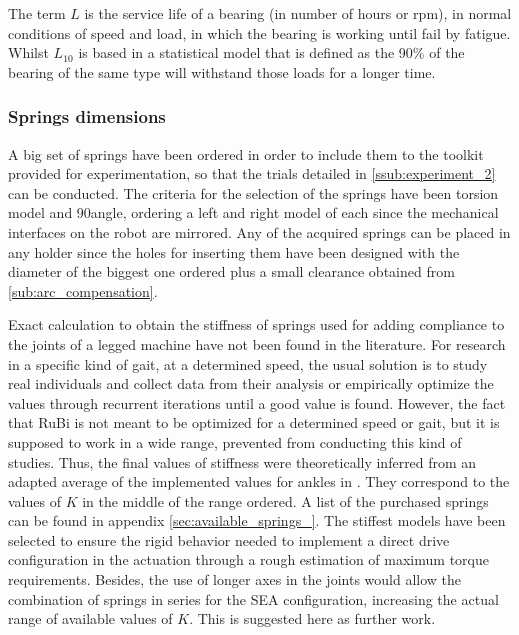 The term $L$ is the service life of a bearing (in number of hours or rpm), in normal conditions of speed and load, in which the bearing is working until fail by fatigue. 
Whilst $L_{10}$ is based in a statistical model that is defined as the 90\% of the bearing of the same type will withstand those loads for a longer time.

\subsubsection{Springs dimensions} %
\label{ssub:springs_dimensions}
A big set of springs have been ordered in order to include them to the toolkit provided for experimentation, so that the trials detailed in \ref{ssub:experiment_2} can be conducted.
The criteria for the selection of the springs have been torsion model and 90\degree angle, ordering a left and right model of each since the mechanical interfaces on the robot are mirrored.
Any of the acquired springs can be placed in any holder since the holes for inserting them have been designed with the diameter of the biggest one ordered plus a small clearance obtained from \ref{sub:arc_compensation}.

Exact calculation to obtain the stiffness of springs used for adding compliance to the joints of a legged machine have not been found in the literature. 
For research in a specific kind of gait, at a determined speed, the usual solution is to study real individuals and collect data from their analysis or empirically optimize the values through recurrent iterations until a good value is found.
However, the fact that RuBi is not meant to be optimized for a determined speed or gait, but it is supposed to work in a wide range, prevented from conducting this kind of studies.
Thus, the final values of stiffness were theoretically inferred from an adapted average of the implemented values for ankles in \cite{grimmer}.
They correspond to the values of $K$ in the middle of the range ordered.
A list of the purchased springs can be found in appendix \ref{sec:available_springs_}.
The stiffest models have been selected to ensure the rigid behavior needed to implement a direct drive configuration in the actuation through a rough estimation of maximum torque requirements.
Besides, the use of longer axes in the joints would allow the combination of springs in series for the SEA configuration, increasing the actual range of available values of $K$.
This is suggested here as further work.



